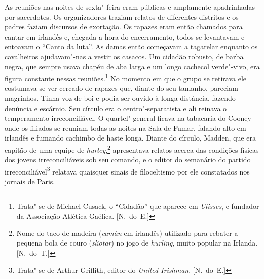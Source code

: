 As reuniões nas noites de sexta"-feira eram públicas e amplamente
apadrinhadas por sacerdotes.  Os organizadores traziam relatos de
diferentes distritos e os padres faziam discursos de exortação.  Os
rapazes eram então chamados para cantar em irlandês e, chegada a hora
do encerramento, todos se levantavam e entoavam o “Canto da luta”.  As
damas então começavam a tagarelar enquanto os cavalheiros ajudavam"-nas
a vestir os casacos.  Um cidadão robusto, de barba negra, que sempre
usava chapéu de aba larga e um longo cachecol verde"-vivo, era figura
constante nessas reuniões.\footnote{ Trata"-se de Michael Cusack, o
“Cidadão” que aparece em \textit{Ulisses}, e fundador da Associação
Atlética Gaélica. [N.~do~E.]}  No momento em que o grupo se retirava ele
costumava se ver cercado de rapazes que, diante do seu tamanho,
pareciam magrinhos.  Tinha voz de boi e podia ser ouvido à longa
distância, fazendo denúncia e escárnio.  Seu círculo era o
centro"-separatista e ali reinava o temperamento irreconciliável.  O
quartel"-general ficava na tabacaria do Cooney onde os filiados se
reuniam todas as noites na Sala de Fumar, falando alto em irlandês e
fumando cachimbo de haste longa.  Diante do círculo, Madden, que era
capitão de uma equipe de \textit{hurley},\footnote{ Nome do taco de
madeira (\textit{camàn} em irlandês) utilizado para rebater a pequena
bola de couro (\textit{sliotar}) no jogo de \textit{hurling}, muito
popular na Irlanda. [N.~do~T.]} apresentava relatos acerca das condições
físicas dos jovens irreconciliáveis sob seu comando, e o editor do
semanário do partido irreconciliável\footnote{ Trata"-se de Arthur
Griffith, editor do \textit{United Irishman}. [N.~do~E.]} relatava
quaisquer sinais de filoceltismo por ele constatados nos jornais de
Paris.

